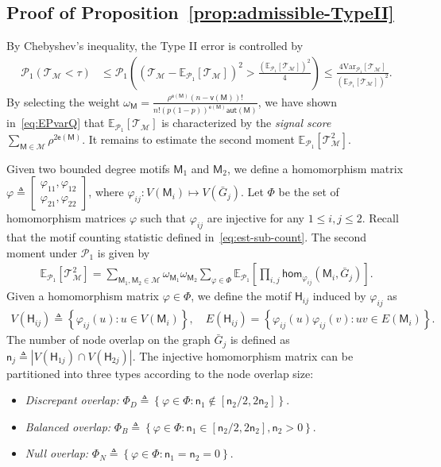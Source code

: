 \documentclass[letterpaper,11pt]{article}
\theoremstyle{definition}
\newcommand{\maM}{\mathcal{M}}
\newcommand{\maP}{\mathcal{P}}
\newcommand{\maT}{\mathcal{T}}
\newcommand{\nbr}[1]{{\sf\color{red}[#1]}}
\newcommand{\en}{\mathsf{{e}}}
\newcommand{\vn}{\mathsf{{v}}}
\newcommand{\pth}[1]{\left( #1 \right)}
\newcommand{\qth}[1]{\left[ #1 \right]}
\newcommand{\sth}[1]{\left\{ #1 \right\}}
\newcommand{\sfH}{{\mathsf{H}}}
\newcommand{\sfM}{{\mathsf{M}}}
\newcommand{\sfn}{{\mathsf{n}}}
\newcommand{\aut}{\mathsf{aut}}
\renewcommand{\hom}{\mathsf{hom}}
\newcommand{\vp}{\varphi}
\def\var{\mathrm{Var}}
\def\E{\mathbb{E}}
\begin{document}
\subsection{Proof of Proposition~\ref{prop:admissible-TypeII}}\label{apd:proof-prop-admi-typeII}

By Chebyshev's inequality, the Type II error is controlled by \begin{align*}
    \maP_1\pth{\maT_{\maM}<\tau}&\le \maP_1\pth{\pth{\maT_{\maM}-\E_{\maP_1}\qth{\maT_{\maM}}}^2 >\frac{\pth{\E_{\maP_1}\qth{\maT_{\maM}}}^2}{4}}\le \frac{4\var_{\maP_1}\qth{\maT_{\maM}}}{\pth{\E_{\maP_1}\qth{\maT_{\maM}}}^2}.
\end{align*}
By selecting the weight $\omega_\sfM = \frac{\rho^{\en(\sfM)} (n-\vn(\sfM))! }{n! (p(1-p))^{\en(\sfM)}\aut(\sfM)}$, we have shown in~\eqref{eq:EPvarQ} that  $\E_{\maP_1}\qth{\maT_{\maM}}$ is characterized by the \emph{signal score} $\sum_{\sfM\in \maM}\rho^{2\en(\sfM)}$. It remains to estimate the second moment $\E_{\maP_1}\qth{\maT_{\maM}^2}$. 

Given two bounded degree motifs $\sfM_1$ and $\sfM_2$, we define a homomorphism matrix $\vp\triangleq \begin{bmatrix}\varphi_{11},\varphi_{12}\\\varphi_{21},\varphi_{22}\end{bmatrix}$, where $\vp_{ij}:V(\sfM_i)\mapsto V(\bar{G}_j)$. Let $\Phi$ be the set of homomorphism matrices $\vp$ such that $\vp_{ij}$ are injective for any $1\le i,j\le 2$. Recall that the motif counting statistic defined in~\eqref{eq:est-sub-count}.
The second moment under $\maP_1$ is given by \begin{align}\label{eq:second-moment-P}
   \E_{\maP_1}\qth{\maT_{\maM}^2}= \sum_{\sfM_1,\sfM_2\in \maM} \omega_{\sfM_1}\omega_{\sfM_2} \sum_{\vp\in \Phi}\E_{\maP_1}\qth{\prod_{i,j}\hom_{\vp_{ij}}(\sfM_i,\bar{G}_j)}.
\end{align}
Given a homomorphism matrix $\vp\in \Phi$, we define the motif $\sfH_{ij}$ induced by $\vp_{ij}$ as\begin{align}\label{eq:Hij}
    V(\sfH_{ij})\triangleq \sth{\vp_{ij}(u):u\in V(\sfM_i)},\quad E(\sfH_{ij}) = \sth{\vp_{ij}(u)\vp_{ij}(v):uv\in E(\sfM_i)}.
\end{align}
The number of node overlap on the graph $\bar{G}_j$ is defined as $\sfn_j\triangleq |V(\sfH_{1j})\cap V(\sfH_{2j})|$. The injective homomorphism matrix can be partitioned into three types according to the node overlap size:%
\begin{itemize}
\item \emph{Discrepant overlap:} $\Phi_D\triangleq \sth{\vp\in \Phi:\sfn_1\notin [\sfn_2/2,2\sfn_2]}$.
    \item \emph{Balanced overlap:} $\Phi_B\triangleq \sth{\vp\in \Phi:\sfn_1\in [\sfn_2/2,2\sfn_2],\sfn_2>0}$.
    \item \emph{Null overlap:} $\Phi_N\triangleq \sth{\vp\in \Phi:\sfn_1 = \sfn_2 = 0}$.
\end{itemize}
\end{document}
